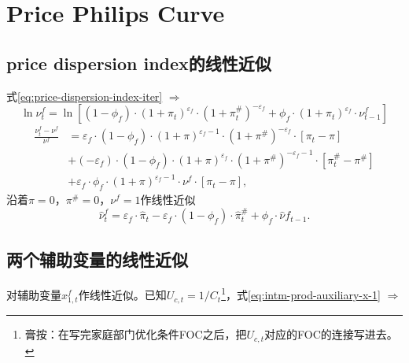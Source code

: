 \section{Price Philips Curve}
\label{sec:price-PC}

\subsection{price dispersion index的线性近似}
\label{sec:price-dispersion-index-lin}

式\eqref{eq:price-dispersion-index-iter} $\Rightarrow$
\begin{equation*}
\ln \nu^f_t = \ln
\left[
\left(1-\phi_f\right) \cdot \left(1+\pi_t\right)^{\varepsilon_f} \cdot \left(1+\pi^{\#}_t\right)^{-\varepsilon_f}
+\phi_f \cdot \left(1+\pi_t\right)^{\varepsilon_f} \cdot \nu^f_{t-1}
\right]
\end{equation*}
\begin{equation*}
\begin{split}
\frac{\nu^f_{t} - \nu^f}{\nu^f} &=\varepsilon_f \cdot \left(1-\phi_f\right) \cdot
\left(1+\pi\right)^{\varepsilon_f-1 } \cdot \left(1+\pi^{\#}\right)^{-\varepsilon_f} \cdot \left[\pi_t-\pi\right] \\
&+\left(-\varepsilon_f\right) \cdot \left(1-\phi_f\right) \cdot \left(1+\pi\right)^{\varepsilon_f} \cdot \left(1+\pi^{\#}\right)^{-\varepsilon_f -1 } \cdot \left[\pi^{\#}_t-\pi^{\#}\right] \\
&+ \varepsilon_f \cdot \phi_f \cdot \left(1+\pi\right)^{\varepsilon_f-1} \cdot \nu^f \cdot \left[\pi_t - \pi\right],
\end{split}
\end{equation*}
沿着$\pi=0$，$\pi^{\#}=0$，$\nu^f=1$作线性近似
\begin{equation}
\hat{\nu}^f_t = \varepsilon_f \cdot \hat{\pi}_t - \varepsilon_f \cdot \left(1-\phi_f\right) \cdot \hat{\pi}^{\#}_t + \phi_f \cdot \hat{\nu}{f}_{t-1}.
\end{equation}

\subsection{两个辅助变量的线性近似}
对辅助变量$x_{1,t}^f$作线性近似。已知$U_{c,t}=1/C_t$\footnote{膏按：在写完家庭部门优化条件FOC之后，把$U_{c,t}$对应的FOC的连接写进去。}，式\eqref{eq:intm-prod-auxiliary-x-1} $\Rightarrow$

